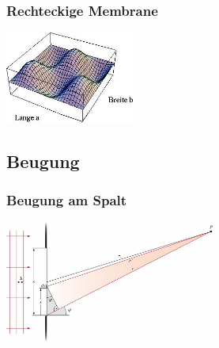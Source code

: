\subsubsection{Rechteckige Membrane}

\begin{center}
	\begin{minipage}{0.25\textwidth}
	\end{minipage}%
	\begin{minipage}{0.25\textwidth}
		\includegraphics[height=3cm,keepaspectratio=true]{Images/rechteckige_membrane.png}
	\end{minipage}
\end{center}






\subsection{Beugung}
\subsubsection{Beugung am Spalt}

\begin{center}
	\begin{minipage}{0.2\textwidth}
	\end{minipage}%
	\begin{minipage}{0.3\textwidth}
		\includegraphics[height=4cm,right,keepaspectratio=true]{Images/beugung_am_spalt.png}
	\end{minipage}
\end{center}









